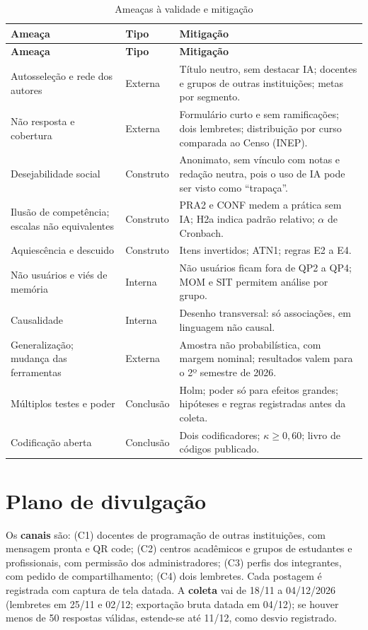 \documentclass[12pt,a4paper]{article}
\newcommand{\fonte}[1]{\par\vspace{1pt}{\footnotesize\singlespacing Fonte: #1}\par\vspace{4pt}}
\newcommand{\thead}[1]{\textbf{#1}}
\begin{document}
{\footnotesize\singlespacing
\begin{longtable}{@{}L{3.4cm}L{1.7cm}L{10.4cm}@{}}
\caption{Ameaças à validade e mitigação}\label{tab:ameacas}\\
\toprule \thead{Ameaça} & \thead{Tipo} & \thead{Mitigação} \\ \midrule \endfirsthead
\toprule \thead{Ameaça} & \thead{Tipo} & \thead{Mitigação} \\ \midrule \endhead
Autosseleção e rede dos autores & Externa & Título neutro, sem destacar IA; docentes e grupos de outras instituições; metas por segmento. \\
Não resposta e cobertura & Externa & Formulário curto e sem ramificações; dois lembretes; distribuição por curso comparada ao Censo (INEP). \\
Desejabilidade social & Construto & Anonimato, sem vínculo com notas e redação neutra, pois o uso de IA pode ser visto como ``trapaça''. \\
Ilusão de competência; escalas não equivalentes & Construto & PRA2 e CONF medem a prática sem IA; H2a indica padrão relativo; $\alpha$ de Cronbach. \\
Aquiescência e descuido & Construto & Itens invertidos; ATN1; regras E2 a E4. \\
Não usuários e viés de memória & Interna & Não usuários ficam fora de QP2 a QP4; MOM e SIT permitem análise por grupo. \\
Causalidade & Interna & Desenho transversal: só associações, em linguagem não causal. \\
Generalização; mudança das ferramentas & Externa & Amostra não probabilística, com margem nominal; resultados valem para o 2º semestre de 2026. \\
Múltiplos testes e poder & Conclusão & Holm; poder só para efeitos grandes; hipóteses e regras registradas antes da coleta. \\
Codificação aberta & Conclusão & Dois codificadores; $\kappa\geq0{,}60$; livro de códigos publicado. \\
\bottomrule
\end{longtable}
\vspace{-6pt}\fonte{Elaborado pelos autores (2026).}
}

\section{Plano de divulgação}

Os \textbf{canais} são: (C1) docentes de programação de outras instituições, com mensagem pronta e QR code; (C2) centros acadêmicos e grupos de estudantes e profissionais, com permissão dos administradores; (C3) perfis dos integrantes, com pedido de compartilhamento; (C4) dois lembretes. Cada postagem é registrada com captura de tela datada. A \textbf{coleta} vai de 18/11 a 04/12/2026 (lembretes em 25/11 e 02/12; exportação bruta datada em 04/12); se houver menos de 50 respostas válidas, estende-se até 11/12, como desvio registrado.
\end{document}
